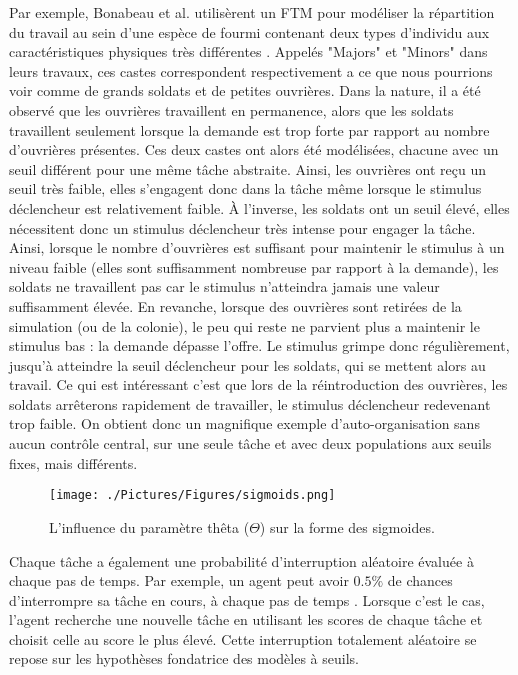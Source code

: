         Par exemple, Bonabeau et al. \cite{bonabeau_quantitative_1996} utilisèrent un FTM pour modéliser la répartition du travail au sein d'une espèce de fourmi contenant deux types d'individu aux caractéristiques physiques très différentes \cite{wilson_relation_1984}. Appelés "Majors" et "Minors" dans leurs travaux, ces castes correspondent respectivement a ce que nous pourrions voir comme de grands soldats et de petites ouvrières. Dans la nature, il a été observé que les ouvrières travaillent en permanence, alors que les soldats travaillent seulement lorsque la demande est trop forte par rapport au nombre d'ouvrières présentes. Ces deux castes ont alors été modélisées, chacune avec un seuil différent pour une même tâche abstraite. Ainsi, les ouvrières ont reçu un seuil très faible, elles s'engagent donc dans la tâche même lorsque le stimulus déclencheur est relativement faible. À l'inverse, les soldats ont un seuil élevé, elles nécessitent donc un stimulus déclencheur très intense pour engager la tâche. Ainsi, lorsque le nombre d'ouvrières est suffisant pour maintenir le stimulus à un niveau faible (elles sont suffisamment nombreuse par rapport à la demande), les soldats ne travaillent pas car le stimulus n'atteindra jamais une valeur suffisamment élevée. En revanche, lorsque des ouvrières sont retirées de la simulation (ou de la colonie), le peu qui reste ne parvient plus a maintenir le stimulus bas : la demande dépasse l'offre. Le stimulus grimpe donc régulièrement, jusqu'à atteindre la seuil déclencheur pour les soldats, qui se mettent alors au travail. Ce qui est intéressant c'est que lors de la réintroduction des ouvrières, les soldats arrêterons rapidement de travailler, le stimulus déclencheur redevenant trop faible. On obtient donc un magnifique exemple d'auto-organisation sans aucun contrôle central, sur une seule tâche et avec deux populations aux seuils fixes, mais différents.
		
		\begin{figure}
		\centering
		\texttt{[image: ./Pictures/Figures/sigmoids.png]}
		\caption{L'influence du paramètre thêta ($\Theta$) sur la forme des sigmoides.}
		\label{sigmoids}
		\end{figure}
		
		Chaque tâche a également une probabilité d'interruption aléatoire évaluée à chaque pas de temps. Par exemple, un agent peut avoir $0.5\%$ de chances d'interrompre sa tâche en cours, à chaque pas de temps \cite{schmickl_analysing_2008}. Lorsque c'est le cas, l'agent recherche une nouvelle tâche en utilisant les scores de chaque tâche et choisit celle au score le plus élevé. Cette interruption totalement aléatoire se repose sur les hypothèses fondatrice des modèles à seuils.
        
